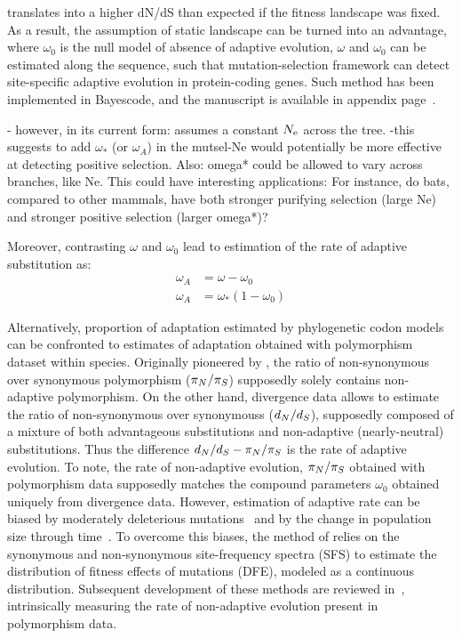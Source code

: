 translates into a higher dN/dS than expected if the fitness landscape was fixed.
As a result, the assumption of static landscape can be turned into an advantage, where $\omega_0$ is the null model of absence of adaptive evolution,
$\omega$ and $\omega_0$ can be estimated along the sequence, such that mutation-selection framework can detect site-specific adaptive evolution in protein-coding genes.
Such method has been implemented in Bayescode, and the manuscript is available in appendix page~\pageref{sec-appendix:MutSelM3starMBE}.

- however, in its current form: assumes a constant $N_{\textrm{e}}$ across the tree.
-this suggests to add $\omega_*$ (or $\omega_A$) in the mutsel-Ne
would potentially be more effective at detecting positive selection.
Also:  omega* could be allowed to vary across branches, like Ne.
This could have interesting applications:
For instance, do bats, compared to other mammals, have both stronger purifying selection (large Ne)
and stronger positive selection (larger omega*)?


Moreover, contrasting $\omega$ and $\omega_0$ lead to estimation of the rate of adaptive \gls{substitution} as:
\begin{align}
    \omega_A & = \omega - \omega_0 \\
    \omega_A & = \omega_* (1 - \omega_0)
\end{align}


Alternatively, proportion of adaptation estimated by phylogenetic codon models can be confronted to estimates of adaptation obtained with polymorphism dataset within species.
Originally pioneered by \citet{McDonald1991}, the ratio of non-synonymous over synonymous polymorphism ($\pi_N / \pi_S$) supposedly solely contains non-adaptive polymorphism.
On the other hand, divergence data allows to estimate the ratio of non-synonymous over \glspl{synonymous} ($d_N / d_S$), supposedly composed of a mixture of both advantageous \glspl{substitution} and non-adaptive (\gls{nearly-neutral}) \glspl{substitution}.
Thus the difference $d_N / d_S - \pi_N / \pi_S$ is the rate of adaptive evolution.
To note, the rate of non-adaptive evolution, $\pi_N / \pi_S$ obtained with polymorphism data supposedly matches the compound parameters $\omega_0$ obtained uniquely from divergence data.
However, estimation of adaptive rate can be biased by moderately deleterious mutations~\citep{eyre-walker_quantifying_2002} and by the change in population size through time~\citep{eyre-walker_changing_2002}.
To overcome this biases, the method of \citet{Galtier2016} relies on the synonymous and non-synonymous site-frequency spectra (\acrshort{SFS}) to estimate the distribution of fitness effects of mutations (\acrshort{DFE}), modeled as a continuous distribution.
Subsequent development of these methods are reviewed in~\citep{Moutinho2019a}, intrinsically measuring the rate of non-adaptive evolution present in polymorphism data.

